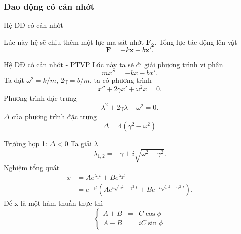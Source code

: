 \subsubsection{Dao động có cản nhớt}
\begin{frame}{Hệ DĐ có cản nhớt}
    \begin{center}
        \resizebox{0.6\linewidth}{!}{}
    \end{center}
    Lúc này hệ sẽ chịu thêm một lực ma sát nhớt \(\mathbf{F_2}\). Tổng lực tác động lên vật
    \begin{equation}
        \displaystyle \mathbf{F} =  - k \mathbf{x} - b \mathbf{x'}.
        \label{eq:2.2_5}
    \end{equation}
\end{frame}
\begin{frame}{Hệ DĐ có cản nhớt - PTVP}
    Lúc này ta sẽ đi giải phương trình vi phân
    \begin{equation}
        mx'' = -kx -b x'.
        \label{eq:2.2_6}
    \end{equation}
    Ta đặt \(\omega^2 = k/m\), \(2\gamma = b/m\), ta có phương trình
    \begin{equation*}
        x'' + 2 \gamma x' + \omega^2 x = 0.
    \end{equation*}
    Phương trình đặc trưng
    \begin{equation}
    \lambda^2 + 2 \gamma \lambda + \omega^2 = 0.
    \label{eq:2.2_7}
    \end{equation}
    \(\Delta\) của phương trình đặc trưng
    \begin{equation}
        \Delta = 4 (\gamma^2 -\omega^2)
        \label{eq:2.2_8}
    \end{equation}
\end{frame}
\begin{frame}{Trường hợp 1: \(\Delta <0\)}
    Ta giải \(\lambda\)
    \begin{equation*}
        \lambda_{1,2} =  - \gamma \pm i \sqrt{\omega^2 - \gamma^2}.
    \end{equation*}
    Nghiệm tổng quát
    \begin{equation}
    \begin{array}{cl}
    x &= A e^{\lambda_1 t} + B e^{\lambda_2 t} \\
    &= e^{-\gamma t} \left(A e^{i\sqrt{\omega^2 - \gamma^2} \ t} + B e^{- i\sqrt{\omega^2 - \gamma^2} \ t} \right).
    \end{array}
    \label{eq:2.2_9}
    \end{equation}
    Để x là một hàm thuần thực thì
    \begin{equation*}
    \left\{
    \begin{array}{ccc}
    A + B &=& C \cos \phi \\
    A - B &=& i C \sin \phi
    \end{array}
    \right.
    \end{equation*}

\end{frame}
